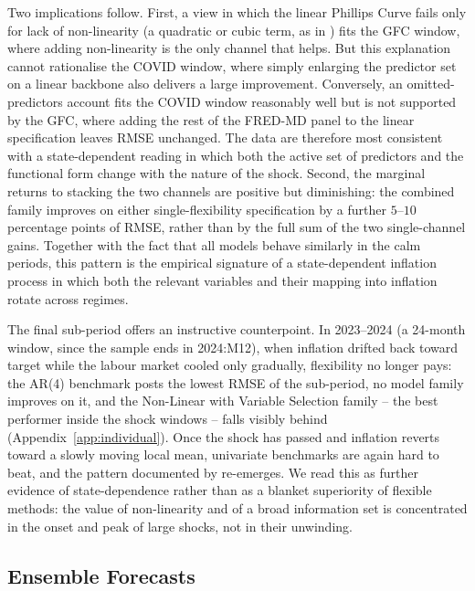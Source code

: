 \documentclass[12pt,a4paper]{article}
\begin{document}
Two implications follow. First, a view in which the linear Phillips Curve fails only for lack of non-linearity (a quadratic or cubic term, as in \citealp{ball2022,gitti2024}) fits the GFC window, where adding non-linearity is the only channel that helps. But this explanation cannot rationalise the COVID window, where simply enlarging the predictor set on a linear backbone also delivers a large improvement. Conversely, an omitted-predictors account \citep{bernanke2023} fits the COVID window reasonably well but is not supported by the GFC, where adding the rest of the FRED-MD panel to the linear specification leaves RMSE unchanged. The data are therefore most consistent with a state-dependent reading in which both the active set of predictors and the functional form change with the nature of the shock. Second, the marginal returns to stacking the two channels are positive but diminishing: the combined family improves on either single-flexibility specification by a further $5$--$10$ percentage points of RMSE, rather than by the full sum of the two single-channel gains. Together with the fact that all models behave similarly in the calm periods, this pattern is the empirical signature of a state-dependent inflation process in which both the relevant variables and their mapping into inflation rotate across regimes.

The final sub-period offers an instructive counterpoint. In 2023--2024 (a 24-month window, since the sample ends in 2024:M12), when inflation drifted back toward target while the labour market cooled only gradually, flexibility no longer pays: the AR(4) benchmark posts the lowest RMSE of the sub-period, no model family improves on it, and the Non-Linear with Variable Selection family -- the best performer inside the shock windows -- falls visibly behind (Appendix~\ref{app:individual}). Once the shock has passed and inflation reverts toward a slowly moving local mean, univariate benchmarks are again hard to beat, and the pattern documented by \citet{atkesonohanian2001} re-emerges. We read this as further evidence of state-dependence rather than as a blanket superiority of flexible methods: the value of non-linearity and of a broad information set is concentrated in the onset and peak of large shocks, not in their unwinding.

\subsection{Ensemble Forecasts}
\label{subsec:ensemble_results}
\end{document}
